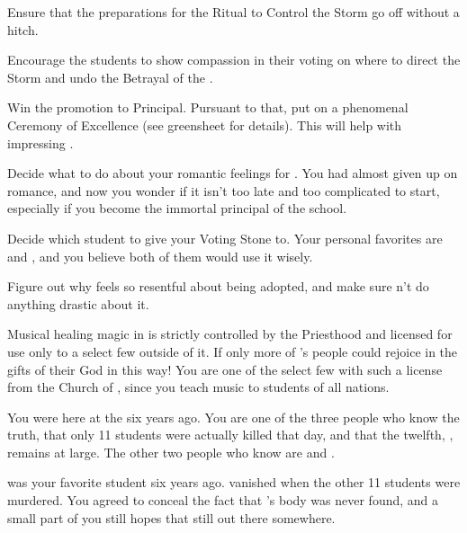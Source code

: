 \documentclass[char]{GL2020}
\begin{document}
\begin{itemz}
    \item Ensure that the preparations for the Ritual to Control the Storm go off without a hitch.
    \item Encourage the students to show compassion in their voting on where to direct the Storm and undo the Betrayal of the \pShip{}.
    \item Win the promotion to Principal. Pursuant to that, put on a phenomenal Ceremony of Excellence (see greensheet for details). This will help with impressing \cPrincipal{}.
    \item Decide what to do about your romantic feelings for \cFlowPriest{}. You had almost given up on romance, and now you wonder if it isn’t too late and too complicated to start, especially if you become the immortal principal of the school.
    \item Decide which student to give your Voting Stone to. Your personal favorites are \cAdopted{} and \cDisney{}, and you believe both of them would use it wisely.
    \item Figure out why \cAdopted{} feels so resentful about being adopted, and make sure \cAdopted{\theydo}n't do anything drastic about it.
\end{itemz}

\begin{itemz}[Notes]
    \item Musical healing magic in \pFarm{} is strictly controlled by the Priesthood and licensed for use only to a select few outside of it. If only more of \cFarmGod{}'s people could rejoice in the gifts of their God in this way! You are one of the select few with such a license from the Church of \cFarmGod{}, since you teach music to students of all nations.
    \item You were here at the \pSchool{} six years ago. You are one of the three people who know the truth, that only 11 students were actually killed that day, and that the twelfth, \cKidScientist{\full}, remains at large. The other two people who know are \cDiplomat{\full} and \cPrincipal{\full}.
    \item \cKidScientist{\full} was your favorite student six years ago. \cKidScientist{\They} vanished when the other 11 students were murdered. You agreed to conceal the fact that \cKidScientist{}'s body was never found, and a small part of you still hopes that \cKidScientist{\theyare} still out there somewhere.
\end{itemz}
\end{document}
